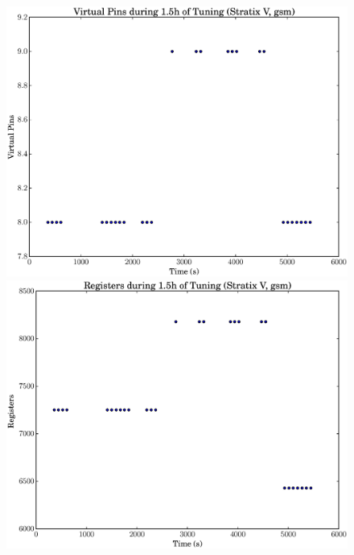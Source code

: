 \documentclass[12pt, a4paper]{article}
\begin{document}
\begin{figure}[htpb]
    \begin{minipage}{.48\textwidth}
        \includegraphics[scale=.25]{gsm_pins_5400_chstone_StratixV}
    \end{minipage}%
    \hfill
    \begin{minipage}{.48\textwidth}
        \includegraphics[scale=.25]{gsm_regs_5400_chstone_StratixV}
    \end{minipage}%


\end{figure}
\end{document}
